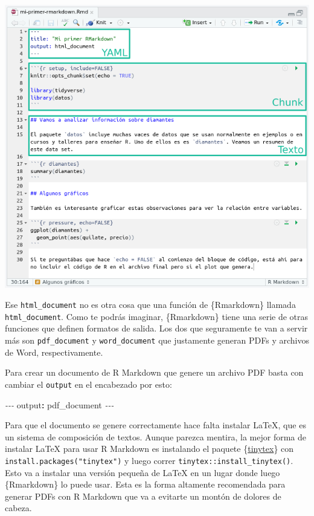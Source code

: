 \documentclass[
  openany]{book}
\newenvironment{Shaded}{\begin{snugshade}}{\end{snugshade}}
\newcommand{\AttributeTok}[1]{\textcolor[rgb]{0.77,0.63,0.00}{#1}}
\newcommand{\FunctionTok}[1]{\textcolor[rgb]{0.00,0.00,0.00}{#1}}
\newcommand{\KeywordTok}[1]{\textcolor[rgb]{0.13,0.29,0.53}{\textbf{#1}}}
\newcommand{\PreprocessorTok}[1]{\textcolor[rgb]{0.56,0.35,0.01}{\textit{#1}}}
\begin{document}
\includegraphics{img/rmd-ejemplo-secciones.png}

Ese \texttt{html\_document} no es otra cosa que una función de \{Rmarkdown\} llamada \texttt{html\_document}. Como te podrás imaginar, \{Rmarkdown\} tiene una serie de otras funciones que definen formatos de salida. Los dos que seguramente te van a servir más son \texttt{pdf\_document} y \texttt{word\_document} que justamente generan PDFs y archivos de Word, respectivamente.

Para crear un documento de R Markdown que genere un archivo PDF basta con cambiar el \texttt{output} en el encabezado por esto:

\begin{Shaded}
\begin{Highlighting}[]
\PreprocessorTok{{-}{-}{-}}
\FunctionTok{output}\KeywordTok{:}\AttributeTok{ pdf\_document}
\PreprocessorTok{{-}{-}{-}}
\end{Highlighting}
\end{Shaded}

Para que el documento se genere correctamente hace falta instalar LaTeX, que es un sistema de composición de textos. Aunque parezca mentira, la mejor forma de instalar LaTeX para usar R Markdown es instalando el paquete \{\href{https://yihui.org/tinytex/}{tinytex}\} con \texttt{install.packages("tinytex")} y luego correr \texttt{tinytex::install\_tinytex()}. Esto va a instalar una versión pequeña de LaTeX en un lugar donde luego \{Rmarkdown\} lo puede usar. Esta es la forma altamente recomendada para generar PDFs con R Markdown que va a evitarte un montón de dolores de cabeza.
\end{document}

